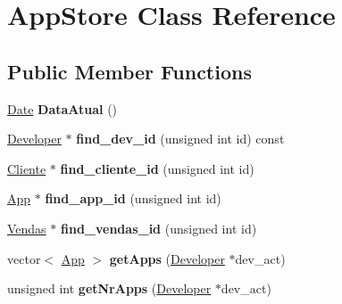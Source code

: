 \hypertarget{class_app_store}{\section{App\+Store Class Reference}
\label{class_app_store}
}
\subsection*{Public Member Functions}
\begin{DoxyCompactItemize}
\item 
\hypertarget{class_app_store_ac89c1f1d006b53ba99661a4c5fccfce1}{\hyperlink{class_date}{Date} {\bfseries Data\+Atual} ()}\label{class_app_store_ac89c1f1d006b53ba99661a4c5fccfce1}

\item 
\hypertarget{class_app_store_a846404e97e4d559aafdb52be79cea7c7}{\hyperlink{class_developer}{Developer} $\ast$ {\bfseries find\+\_\+dev\+\_\+id} (unsigned int id) const }\label{class_app_store_a846404e97e4d559aafdb52be79cea7c7}

\item 
\hypertarget{class_app_store_a722d56a8ed98ad6cb26521be7129d38f}{\hyperlink{class_cliente}{Cliente} $\ast$ {\bfseries find\+\_\+cliente\+\_\+id} (unsigned int id)}\label{class_app_store_a722d56a8ed98ad6cb26521be7129d38f}

\item 
\hypertarget{class_app_store_ae123ae1f957d51b7c4872fe71e23629d}{\hyperlink{class_app}{App} $\ast$ {\bfseries find\+\_\+app\+\_\+id} (unsigned int id)}\label{class_app_store_ae123ae1f957d51b7c4872fe71e23629d}

\item 
\hypertarget{class_app_store_ad27a968e34cfe98fceca2b78fe1b2b70}{\hyperlink{class_vendas}{Vendas} $\ast$ {\bfseries find\+\_\+vendas\+\_\+id} (unsigned int id)}\label{class_app_store_ad27a968e34cfe98fceca2b78fe1b2b70}

\item 
\hypertarget{class_app_store_a72f40c3c07e2207d9157533426d64ceb}{vector$<$ \hyperlink{class_app}{App} $>$ {\bfseries get\+Apps} (\hyperlink{class_developer}{Developer} $\ast$dev\+\_\+act)}\label{class_app_store_a72f40c3c07e2207d9157533426d64ceb}

\item 
\hypertarget{class_app_store_ae62d409b52edfc19e35f0388a26d9911}{unsigned int {\bfseries get\+Nr\+Apps} (\hyperlink{class_developer}{Developer} $\ast$dev\+\_\+act)}\label{class_app_store_ae62d409b52edfc19e35f0388a26d9911}


\end{DoxyCompactItemize}
